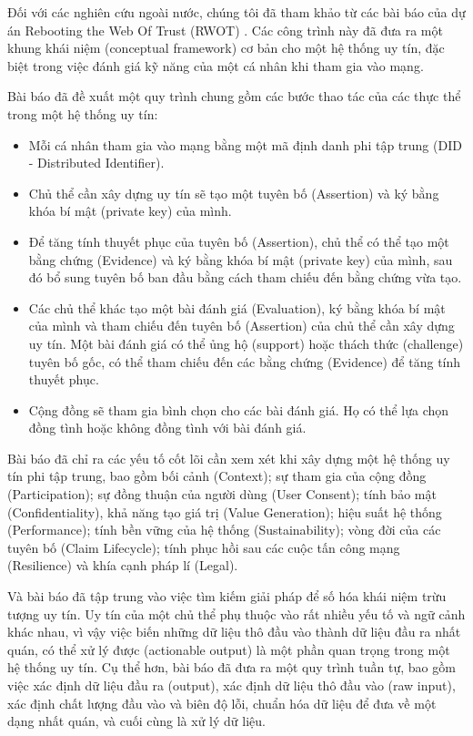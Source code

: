 \documentclass{article}[14pt]
\begin{document}
{            \par
            Đối với các nghiên cứu ngoài nước, chúng tôi đã tham khảo từ các bài báo của dự án Rebooting the Web Of Trust (RWOT) \cite{reputation-toolkit, reputation-design, reputation-interpretation}. Các công trình này đã đưa ra một khung khái niệm (conceptual framework) cơ bản cho một hệ thống uy tín, đặc biệt trong việc đánh giá kỹ năng của một cá nhân khi tham gia vào mạng. 
            \par
            Bài báo \cite{reputation-toolkit} đã đề xuất một quy trình chung gồm các bước thao tác của các thực thể trong một hệ thống uy tín:
            \begin{itemize}
                \item Mỗi cá nhân tham gia vào mạng bằng một mã định danh phi tập trung (DID - Distributed Identifier). 
                \item Chủ thể cần xây dựng uy tín sẽ tạo một tuyên bố (Assertion) và ký bằng khóa bí mật (private key) của mình. 
                \item Để tăng tính thuyết phục của tuyên bố (Assertion), chủ thể có thể tạo một bằng chứng (Evidence) và ký bằng khóa bí mật (private key) của mình, sau đó bổ sung tuyên bố ban đầu bằng cách tham chiếu đến bằng chứng vừa tạo.
                \item Các chủ thể khác tạo một bài đánh giá (Evaluation), ký bằng khóa bí mật của mình và tham chiếu đến tuyên bố (Assertion) của chủ thể cần xây dựng uy tín. Một bài đánh giá có thể ủng hộ (support) hoặc thách thức (challenge) tuyên bố gốc, có thể tham chiếu đến các bằng chứng (Evidence) để tăng tính thuyết phục. 
                \item Cộng đồng sẽ tham gia bình chọn cho các bài đánh giá. Họ có thể lựa chọn đồng tình hoặc không đồng tình với bài đánh giá. 
            \end{itemize}
            Bài báo \cite{reputation-design} đã chỉ ra các yếu tố cốt lõi cần xem xét khi xây dựng một hệ thống uy tín phi tập trung, bao gồm bối cảnh (Context); sự tham gia của cộng đồng (Participation); sự đồng thuận của người dùng (User Consent); tính bảo mật (Confidentiality), khả năng tạo giá trị (Value Generation); hiệu suất hệ thống (Performance); tính bền vững của hệ thống (Sustainability); vòng đời của các tuyên bố (Claim Lifecycle); tính phục hồi sau các cuộc tấn công mạng (Resilience) và khía cạnh pháp lí (Legal). 
            \par
            Và bài báo \cite{reputation-interpretation} đã tập trung vào việc tìm kiếm giải pháp để số hóa khái niệm trừu tượng uy tín. Uy tín của một chủ thể phụ thuộc vào rất nhiều yếu tố và ngữ cảnh khác nhau, vì vậy việc biến những dữ liệu thô đầu vào thành dữ liệu đầu ra nhất quán, có thể xử lý được (actionable output) là một phần quan trọng trong một hệ thống uy tín. Cụ thể hơn, bài báo đã đưa ra một quy trình tuần tự, bao gồm việc xác định dữ liệu đầu ra (output), xác định dữ liệu thô đầu vào (raw input), xác định chất lượng đầu vào và biên độ lỗi, chuẩn hóa dữ liệu để đưa về một dạng nhất quán, và cuối cùng là xử lý dữ liệu.
}
\end{document}
